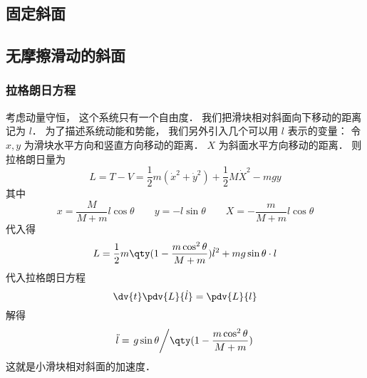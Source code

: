 
\subsection{固定斜面}

\subsection{无摩擦滑动的斜面}

\subsubsection{拉格朗日方程}
考虑动量守恒， 这个系统只有一个自由度． 我们把滑块相对斜面向下移动的距离记为 $l$． 为了描述系统动能和势能， 我们另外引入几个可以用 $l$ 表示的变量： 令 $x, y$ 为滑块水平方向和竖直方向移动的距离． $X$ 为斜面水平方向移动的距离． 则拉格朗日量为
\begin{equation}
L = T - V = \frac12 m(\dot x^2 + \dot y^2) + \frac12 M \dot X^2 - mgy
\end{equation}
其中
\begin{equation}
x = \frac{M}{M + m}l\cos\theta
\qquad
y = -l\sin\theta
\qquad
X = -\frac{m}{M + m}l\cos\theta
\end{equation}
代入得
\begin{equation}
L = \frac{1}{2}m \qty(1 - \frac{m\cos^2\theta}{M + m}) \dot l^2 + mg\sin\theta \cdot l
\end{equation}
代入拉格朗日方程
\begin{equation}
\dv{t} \pdv{L}{\dot l} = \pdv{L}{l}
\end{equation}
解得
\begin{equation}
\ddot l = \left.g\sin\theta\middle/\qty(1 - \frac{m\cos^2\theta}{M + m})\right.
\end{equation}
这就是小滑块相对斜面的加速度．
